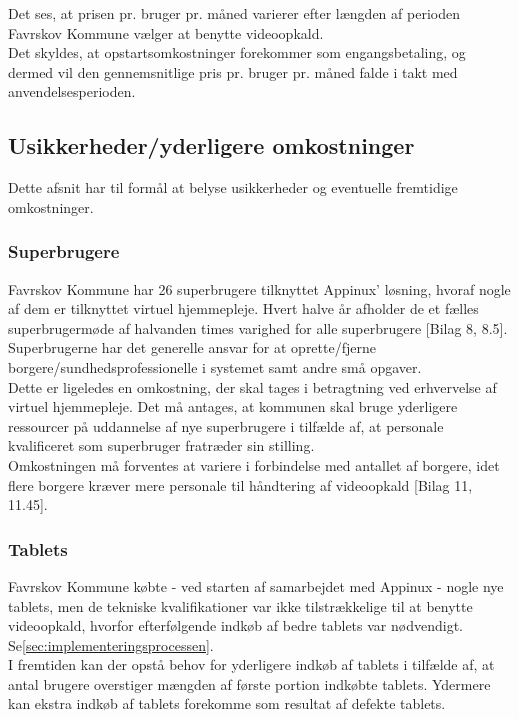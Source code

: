 Det ses, at prisen pr. bruger pr. måned varierer efter længden af perioden Favrskov Kommune vælger at benytte videoopkald.\\ Det skyldes, at opstartsomkostninger forekommer som engangsbetaling, og dermed vil den gennemsnitlige pris pr. bruger pr. måned falde i takt med anvendelsesperioden. 

\subsection{Usikkerheder/yderligere omkostninger}
Dette afsnit har til formål at belyse usikkerheder og eventuelle fremtidige omkostninger. 

\subsubsection{Superbrugere}
Favrskov Kommune har 26 superbrugere tilknyttet Appinux’ løsning, hvoraf nogle af dem er tilknyttet virtuel hjemmepleje. Hvert halve år afholder de et fælles superbrugermøde af halvanden times varighed for alle superbrugere [Bilag 8, 8.5].\\
Superbrugerne har det generelle ansvar for at oprette/fjerne borgere/sundhedsprofessionelle i systemet samt andre små opgaver. \\
Dette er ligeledes en omkostning, der skal tages i betragtning ved erhvervelse af virtuel hjemmepleje. Det må antages, at kommunen skal bruge yderligere ressourcer på uddannelse af nye superbrugere i tilfælde af, at personale kvalificeret som superbruger fratræder sin stilling. \\
Omkostningen må forventes at variere i forbindelse med antallet af borgere, idet flere borgere kræver mere personale til håndtering af videoopkald [Bilag 11, 11.45].

\subsubsection{Tablets}
Favrskov Kommune købte - ved starten af samarbejdet med Appinux - nogle nye tablets, men de tekniske kvalifikationer var ikke tilstrækkelige til at benytte videoopkald, hvorfor efterfølgende indkøb af bedre tablets var nødvendigt. Se\vref{sec:implementeringsprocessen}.  \\
I fremtiden kan der opstå behov for yderligere indkøb af tablets i tilfælde af, at antal brugere overstiger mængden af første portion indkøbte tablets. Ydermere kan ekstra indkøb af tablets forekomme som resultat af defekte tablets.

